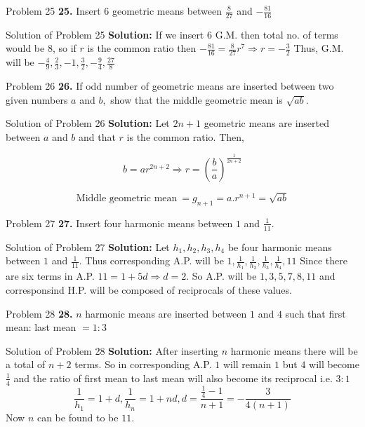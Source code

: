 \documentclass[aspectratio=1610,8pt]{beamer}
\begin{document}
\begin{frame}{Problem 25}
  \textbf{25.} Insert $6$ geometric means between $\frac{8}{27}$ and
  $-\frac{81}{16}$
\end{frame}
\begin{frame}{Solution of Problem 25}
  \textbf{Solution:} If we insert $6$ G.M. then total no. of terms would be
  $8$, so if $r$ is the common ratio then $-\frac{81}{16} = \frac{8}{27}r^7
  \Rightarrow r = -\frac{3}{2}$
  \linebreak
  \linebreak
  Thus, G.M. will be $-\frac{4}{9}, \frac{2}{3}, -1, \frac{3}{2}, -\frac{9}{4},
  \frac{27}{8}$
\end{frame}
\begin{frame}{Problem 26}
  \textbf{26.} If odd number of geometric means are inserted between two given
  numbers $a$ and $b,$ show that the middle geometric mean is $\sqrt{ab}.$
\end{frame}
\begin{frame}{Solution of Problem 26}
  \textbf{Solution:} Let $2n + 1$ geometric means are inserted between $a$ and
  $b$ and that $r$ is the common ratio. Then,

  $$b = ar^{2n + 2} \Rightarrow r = \left(\frac{b}{a}\right)^{\frac{1}{2n +
      2}}$$

  $$\text{Middle geometric mean}~ = g_{n + 1} = a.r^{n + 1} = \sqrt{ab}$$
\end{frame}
\begin{frame}{Problem 27}
  \textbf{27.} Insert four harmonic means between $1$ and $\frac{1}{11}.$
\end{frame}
\begin{frame}{Solution of Problem 27}
  \textbf{Solution:} Let $h_1, h_2, h_3, h_4$ be four harmonic means between
  $1$ and $\frac{1}{11}$. Thus corresponding A.P. will be $1, \frac{1}{h_1},
  \frac{1}{h_2}, \frac{1}{h_3}, \frac{1}{h_4}, 11$
  \linebreak
  \linebreak
  Since there are six terms in A.P. $11 = 1 + 5d \Rightarrow d = 2.$
  So A.P. will be $1, 3, 5, 7, 8, 11$ and corresponsind H.P. will be composed
  of reciprocals of these values.
\end{frame}
\begin{frame}{Problem 28}
  \textbf{28.} $n$ harmonic means are inserted between $1$ and $4$ such that
  first mean: last mean $= 1:3$
\end{frame}
\begin{frame}{Solution of Problem 28}
  \textbf{Solution:} After inserting $n$ harmonic means there will be a total
  of $n + 2$ terms. So in corresponding A.P. $1$ will remain $1$ but $4$ will
  become $\frac{1}{4}$ and the ratio of first mean to last mean will also
  become its reciprocal i.e. $3:1$
  \linebreak
  \linebreak
  $$\frac{1}{h_1} = 1 + d, \frac{1}{h_n} = 1 + nd, d = \frac{\frac{1}{4} -
    1}{n + 1}= -\frac{3}{4(n + 1)}$$
  \linebreak
  \linebreak
  Now $n$ can be found to be $11.$
\end{frame}
\end{document}
